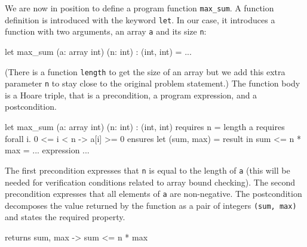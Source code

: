 We are now in position to define a program function
\verb|max_sum|. A function definition is introduced with the keyword
\texttt{let}. In our case, it introduces a function with two arguments,
an array \texttt{a} and its size \texttt{n}:
\begin{whycode}
  let max_sum (a: array int) (n: int) : (int, int) = ...
\end{whycode}
(There is a function \texttt{length} to get the size of an array but
we add this extra parameter \texttt{n} to stay close to the original
problem statement.) The function body is a Hoare triple, that is a
precondition, a program expression, and a postcondition.
\begin{whycode}
  let max_sum (a: array int) (n: int) : (int, int)
    requires { n = length a }
    requires { forall i. 0 <= i < n -> a[i] >= 0 }
    ensures  { let (sum, max) = result in sum <= n * max }
  = ... expression ...
\end{whycode}
The first precondition expresses that \texttt{n} is
equal to the length of \texttt{a} (this will be needed for
verification conditions related to array bound checking).
The second precondition expresses that all
elements of \texttt{a} are non-negative.
The postcondition decomposes the value returned by the function
as a pair of integers \texttt{(sum, max)} and states the required property.
\begin{whycode}
    returns { sum, max -> sum <= n * max }
\end{whycode}

